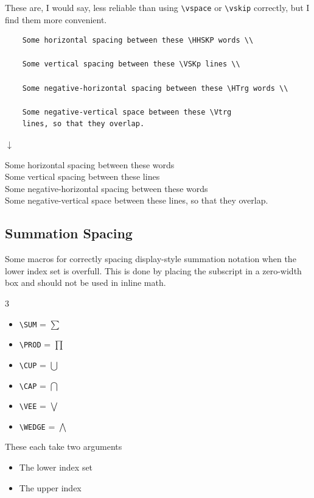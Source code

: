 \documentclass{article}
\begin{document}
These are, I would say, less reliable than using \verb|\vspace| or \verb|\vskip| correctly, but I find them more convenient.
\begin{tcolorbox}
	\begin{verbatim}
	Some horizontal spacing between these \HHSKP words \\

	Some vertical spacing between these \VSKp lines \\

	Some negative-horizontal spacing between these \HTrg words \\
	
	Some negative-vertical space between these \Vtrg
	lines, so that they overlap.
	\end{verbatim}
	\begin{center}$\downarrow$\end{center}
	\Vskp
	Some horizontal spacing between these \HSKP words \\
	
	Some vertical spacing between these \VSKp lines \\
	
	Some negative-horizontal spacing between these \HTrg words \\
	
	Some negative-vertical space between these \Vtrg
	lines, so that they overlap.
\end{tcolorbox}



\subsection*{Summation Spacing}

Some macros for correctly spacing display-style summation notation when the lower index set is overfull. This is done by placing the subscript in a zero-width box and should not be used in inline math.
	\vtrg\begin{multicols}{3}
	\begin{itemize}
	\item \verb|\SUM|   = $\displaystyle\sum$
	\item \verb|\PROD|  = $\displaystyle\prod$
	\item \verb|\CUP|   = $\displaystyle\bigcup$
	\item \verb|\CAP|   = $\displaystyle\bigcap$
	\item \verb|\VEE|   = $\displaystyle\bigvee$
	\item \verb|\WEDGE| = $\displaystyle\bigwedge$
	\end{itemize}
	\end{multicols}\Vtrg\vtrg
These each take two arguments
	\begin{itemize}
		\item[\texttt M.] The lower index set
		\item[\texttt O.] The upper index
	\end{itemize}
	
\end{document}
